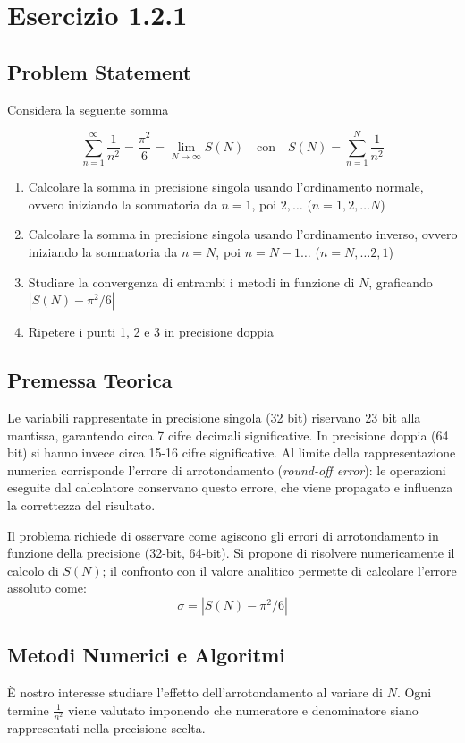 
\section{Esercizio 1.2.1}
\label{sec: basilea}

\subsection{Problem Statement}
Considera la seguente somma

\[
\sum_{n=1}^{\infty} \frac{1}{n^2} = \frac{\pi^2}{6} = \lim_{N \to \infty} S(N) \quad \text{con} \quad S(N) = \sum_{n=1}^{N} \frac{1}{n^2}
\]


\begin{enumerate}
    \item Calcolare la somma in precisione singola usando l'ordinamento normale, ovvero iniziando la sommatoria da $n = 1$, poi $2, \dots$ ($n = 1, 2, \dots N$)
    \item Calcolare la somma in precisione singola usando l'ordinamento inverso, ovvero iniziando la sommatoria da $n = N$, poi $n = N - 1 \dots$ ($n = N, \dots 2, 1$)
    \item Studiare la convergenza di entrambi i metodi in funzione di $N$, graficando $|S(N) - \pi^2/6|$
    \item Ripetere i punti 1, 2 e 3 in precisione doppia
\end{enumerate}

\subsection{Premessa Teorica}
Le variabili rappresentate in precisione singola (32 bit) riservano 23 bit alla mantissa, garantendo circa 7 cifre decimali significative. In precisione doppia (64 bit) si hanno invece circa 15-16 cifre significative. Al limite della rappresentazione numerica corrisponde l'errore di arrotondamento (\textit{round-off error}): le operazioni eseguite dal calcolatore conservano questo errore, che viene propagato e influenza la correttezza del risultato.

Il problema richiede di osservare come agiscono gli errori di arrotondamento in funzione della precisione (32-bit, 64-bit). Si propone di risolvere numericamente il calcolo di $S(N)$; il confronto con il valore analitico permette di calcolare l'errore assoluto come:
\[
    \sigma = |S(N) - \pi^2/6|
\]

\subsection{Metodi Numerici e Algoritmi}
È nostro interesse studiare l'effetto dell'arrotondamento al variare di $N$. Ogni termine $\frac{1}{n^2}$ viene valutato imponendo che numeratore e denominatore siano rappresentati nella precisione scelta.

